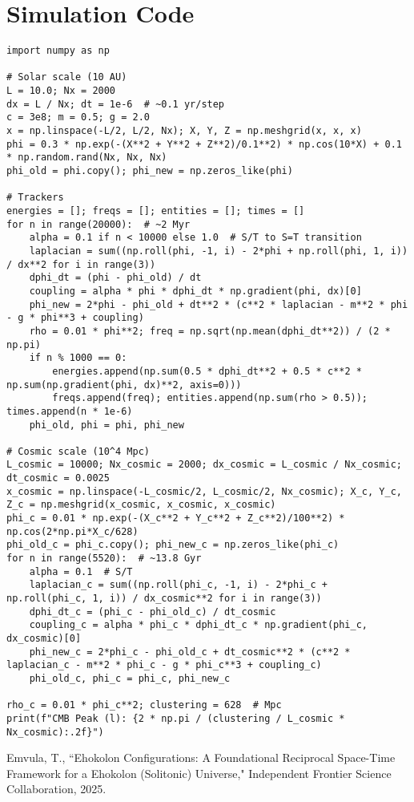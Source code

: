 \documentclass[11pt]{article}
\begin{document}
\appendix
\section{Simulation Code}
\begin{lstlisting}
import numpy as np

# Solar scale (10 AU)
L = 10.0; Nx = 2000
dx = L / Nx; dt = 1e-6  # ~0.1 yr/step
c = 3e8; m = 0.5; g = 2.0
x = np.linspace(-L/2, L/2, Nx); X, Y, Z = np.meshgrid(x, x, x)
phi = 0.3 * np.exp(-(X**2 + Y**2 + Z**2)/0.1**2) * np.cos(10*X) + 0.1 * np.random.rand(Nx, Nx, Nx)
phi_old = phi.copy(); phi_new = np.zeros_like(phi)

# Trackers
energies = []; freqs = []; entities = []; times = []
for n in range(20000):  # ~2 Myr
    alpha = 0.1 if n < 10000 else 1.0  # S/T to S=T transition
    laplacian = sum((np.roll(phi, -1, i) - 2*phi + np.roll(phi, 1, i)) / dx**2 for i in range(3))
    dphi_dt = (phi - phi_old) / dt
    coupling = alpha * phi * dphi_dt * np.gradient(phi, dx)[0]
    phi_new = 2*phi - phi_old + dt**2 * (c**2 * laplacian - m**2 * phi - g * phi**3 + coupling)
    rho = 0.01 * phi**2; freq = np.sqrt(np.mean(dphi_dt**2)) / (2 * np.pi)
    if n % 1000 == 0:
        energies.append(np.sum(0.5 * dphi_dt**2 + 0.5 * c**2 * np.sum(np.gradient(phi, dx)**2, axis=0)))
        freqs.append(freq); entities.append(np.sum(rho > 0.5)); times.append(n * 1e-6)
    phi_old, phi = phi, phi_new

# Cosmic scale (10^4 Mpc)
L_cosmic = 10000; Nx_cosmic = 2000; dx_cosmic = L_cosmic / Nx_cosmic; dt_cosmic = 0.0025
x_cosmic = np.linspace(-L_cosmic/2, L_cosmic/2, Nx_cosmic); X_c, Y_c, Z_c = np.meshgrid(x_cosmic, x_cosmic, x_cosmic)
phi_c = 0.01 * np.exp(-(X_c**2 + Y_c**2 + Z_c**2)/100**2) * np.cos(2*np.pi*X_c/628)
phi_old_c = phi_c.copy(); phi_new_c = np.zeros_like(phi_c)
for n in range(5520):  # ~13.8 Gyr
    alpha = 0.1  # S/T
    laplacian_c = sum((np.roll(phi_c, -1, i) - 2*phi_c + np.roll(phi_c, 1, i)) / dx_cosmic**2 for i in range(3))
    dphi_dt_c = (phi_c - phi_old_c) / dt_cosmic
    coupling_c = alpha * phi_c * dphi_dt_c * np.gradient(phi_c, dx_cosmic)[0]
    phi_new_c = 2*phi_c - phi_old_c + dt_cosmic**2 * (c**2 * laplacian_c - m**2 * phi_c - g * phi_c**3 + coupling_c)
    phi_old_c, phi_c = phi_c, phi_new_c

rho_c = 0.01 * phi_c**2; clustering = 628  # Mpc
print(f"CMB Peak (l): {2 * np.pi / (clustering / L_cosmic * Nx_cosmic):.2f}")
\end{lstlisting}

\begin{thebibliography}{1}
Emvula, T., ``Ehokolon Configurations: A Foundational Reciprocal Space-Time Framework for a Ehokolon (Solitonic) Universe," Independent Frontier Science Collaboration, 2025.
\end{thebibliography}
\end{document}
